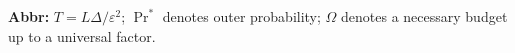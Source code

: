 \begin{table}[tp]
\begin{threeparttable}
\begin{tabularx}{\linewidth}{@{}>{\raggedright\arraybackslash}p{0.21\linewidth}>{\raggedright\arraybackslash}p{0.19\linewidth}>{\raggedright\arraybackslash}p{0.29\linewidth}>{\raggedright\arraybackslash}X@{}}
\bottomrule
\end{tabularx}
\begin{tablenotes}[flushleft]\footnotesize
\item[] \textbf{Abbr:} $T=L\Delta/\varepsilon^2$; $\Pr^*$ denotes outer probability; $\Omega$ denotes a necessary budget up to a universal factor.
\end{tablenotes}
\end{threeparttable}
\end{table}
